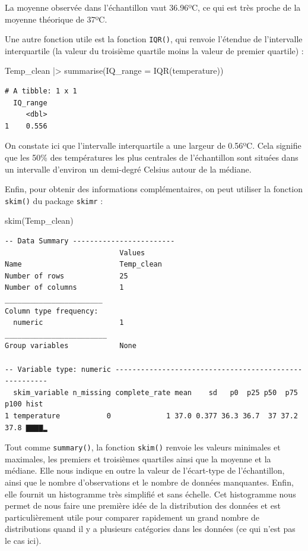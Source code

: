 \documentclass[
  french,
  a4paper,
  DIV=11,
  numbers=noendperiod,
  oneside]{scrreprt}
\newenvironment{Shaded}{}{}
\newcommand{\AttributeTok}[1]{\textcolor[rgb]{0.84,0.23,0.29}{#1}}
\newcommand{\FunctionTok}[1]{\textcolor[rgb]{0.44,0.26,0.76}{#1}}
\newcommand{\NormalTok}[1]{\textcolor[rgb]{0.14,0.16,0.18}{#1}}
\newcommand{\SpecialCharTok}[1]{\textcolor[rgb]{0.00,0.36,0.77}{#1}}
\begin{document}
La moyenne observée dans l'échantillon vaut 36.96ºC, ce qui est très
proche de la moyenne théorique de 37ºC.

Une autre fonction utile est la fonction \texttt{IQR()}, qui renvoie
l'étendue de l'intervalle interquartile (la valeur du troisième quartile
moins la valeur de premier quartile) :

\begin{Shaded}
\begin{Highlighting}[]
\NormalTok{Temp\_clean }\SpecialCharTok{|\textgreater{}}
  \FunctionTok{summarise}\NormalTok{(}\AttributeTok{IQ\_range =} \FunctionTok{IQR}\NormalTok{(temperature))}
\end{Highlighting}
\end{Shaded}

\begin{verbatim}
# A tibble: 1 x 1
  IQ_range
     <dbl>
1    0.556
\end{verbatim}

On constate ici que l'intervalle interquartile a une largeur de 0.56ºC.
Cela signifie que les 50\% des températures les plus centrales de
l'échantillon sont situées dans un intervalle d'environ un demi-degré
Celsius autour de la médiane.

Enfin, pour obtenir des informations complémentaires, on peut utiliser
la fonction \texttt{skim()} du package \texttt{skimr} :

\begin{Shaded}
\begin{Highlighting}[]
\FunctionTok{skim}\NormalTok{(Temp\_clean)}
\end{Highlighting}
\end{Shaded}

\begin{verbatim}
-- Data Summary ------------------------
                           Values    
Name                       Temp_clean
Number of rows             25        
Number of columns          1         
_______________________              
Column type frequency:               
  numeric                  1         
________________________             
Group variables            None      

-- Variable type: numeric ------------------------------------------------------
  skim_variable n_missing complete_rate mean    sd   p0  p25 p50  p75 p100 hist 
1 temperature           0             1 37.0 0.377 36.3 36.7  37 37.2 37.8 ▇▇▇▇▂
\end{verbatim}

Tout comme \texttt{summary()}, la fonction \texttt{skim()} renvoie les
valeurs minimales et maximales, les premiers et troisièmes quartiles
ainsi que la moyenne et la médiane. Elle nous indique en outre la valeur
de l'écart-type de l'échantillon, ainsi que le nombre d'observations et
le nombre de données manquantes. Enfin, elle fournit un histogramme très
simplifié et sans échelle. Cet histogramme nous permet de nous faire une
première idée de la distribution des données et est particulièrement
utile pour comparer rapidement un grand nombre de distributions quand il
y a plusieurs catégories dans les données (ce qui n'est pas le cas ici).
\end{document}
